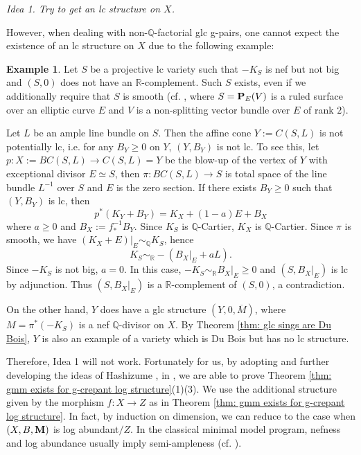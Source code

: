 \documentclass[11pt]{amsart}
\numberwithin{equation}{section}
\newcommand{\Mm}{{\bf{M}}}
\newcommand{\PP}{{\bf{P}}}
\newcommand{\Qq}{\mathbb{Q}}
\newcommand{\Rr}{\mathbb{R}}
\theoremstyle{definition}
\theoremstyle{definition}
\newtheorem{ex}[thm]{Example}
\theoremstyle{definition}
\begin{document}
 \smallskip
 
 \noindent\textit{Idea 1. Try to get an lc structure on $X$.}
 
 \smallskip
 
However, when dealing with non-$\mathbb Q$-factorial glc g-pairs, one cannot expect the existence of an lc structure on $X$ due to the following example:

\begin{ex}\label{ex: glc not lc}
Let $S$ be a projective lc variety such that $-K_S$ is nef but not big and $(S,0)$ does not have an $\mathbb R$-complement. Such $S$ exists, even if we additionally require that $S$ is smooth (cf. \cite[1.1 Example]{Sho00}, where $S=\PP_E(V)$ is a ruled surface over an elliptic curve $E$ and $V$ is a non-splitting vector bundle over $E$ of rank $2$). 

Let $L$ be an ample line bundle on $S$. Then the affine cone $Y:=C(S,L)$ is not potentially lc, i.e. for any $B_Y\geq 0$ on $Y$, $(Y,B_Y)$ is not lc. To see this, let $p:X:=BC(S,L)\to C(S,L)=Y$ be the blow-up of the vertex of $Y$ with exceptional divisor $E\simeq S$, then $\pi:BC(S,L)\to S$ is total space of the line bundle $L^{-1}$ over $S$ and $E$ is the zero section. If there exists $B_Y\ge0$ such that $(Y,B_Y)$ is lc, then
$$
p^*(K_Y+B_Y)=K_X+(1-a)E+B_X
$$
where $a\geq 0$ and $B_X:=f^{-1}_*B_Y$. Since $K_S$ is $\mathbb Q$-Cartier, $K_X$ is $\Qq$-Cartier. Since $\pi$ is smooth, we have $(K_X+E)|_E\sim_{\Qq} K_S$, hence
$$
K_S\sim_{\Rr}-(B_X|_{E}+aL).
$$
Since $-K_S$ is not big, $a=0$. In this case, $-K_S\sim_{\Rr}B_X|_{E}\ge0$ and $(S,B_X|_E)$ is lc by adjunction. Thus $(S,B_X|_E)$ is a $\Rr$-complement of $(S,0)$, a contradiction. 

On the other hand, $Y$ does have a glc structure $(Y,0,\overline{M})$, where $M=\pi^*(-K_S)$ is a nef $\mathbb Q$-divisor on $X$. By Theorem \ref{thm: glc sings are Du Bois}, $Y$ is also an example of a variety which is Du Bois but has no lc structure.



\end{ex}




Therefore, Idea 1 will not work. Fortunately for us, by adopting and further developing the ideas of Hashizume \cite{Has20b,Has22}, in \cite{LX22}, we are able to prove Theorem \ref{thm: gmm exists for g-crepant log structure}(1)(3). We use the additional structure given by the morphism $f: X\rightarrow Z$ as in Theorem \ref{thm: gmm exists for g-crepant log structure}. In fact, by induction on dimension, we can reduce to the case when $(X,B,\Mm)$ is log abundant$/Z$. In the classical minimal model program, nefness and log abundance usually imply semi-ampleness (cf. \cite{FG14,HX16,Has20a}). 
\end{document}
